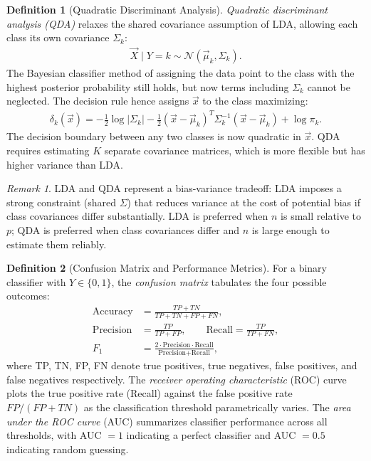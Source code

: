 \documentclass[11pt]{article}
\theoremstyle{definition}
\newtheorem{definition}{Definition}[section]
\theoremstyle{plain}
\theoremstyle{remark}
\newtheorem{remark}{Remark}[section]
\begin{document}
\begin{definition}[Quadratic Discriminant Analysis]
    \textit{Quadratic discriminant analysis (QDA)} relaxes the shared covariance assumption of LDA, allowing each class its own covariance $\Sigma_k$:
    \begin{align}
        \vec{X} \mid Y = k \sim \mathcal{N}(\vec{\mu}_k, \Sigma_k).
    \end{align}
    The Bayesian classifier method of assigning the data point to the class with the highest posterior probability still holds, but now terms including $\Sigma_k$ cannot be neglected. The decision rule hence assigns $\vec{x}$ to the class maximizing:
    \begin{align}
        \delta_k(\vec{x}) = -\frac{1}{2}\log|\Sigma_k| - \frac{1}{2}(\vec{x}-\vec{\mu}_k)^T\Sigma_k^{-1}(\vec{x}-\vec{\mu}_k) + \log\pi_k.
    \end{align}
    The decision boundary between any two classes is now quadratic in $\vec{x}$. QDA requires estimating $K$ separate covariance matrices, which is more flexible but has higher variance than LDA.
\end{definition}

\begin{remark}
    LDA and QDA represent a bias-variance tradeoff: LDA imposes a strong constraint (shared $\Sigma$) that reduces variance at the cost of potential bias if class covariances differ substantially. LDA is preferred when $n$ is small relative to $p$; QDA is preferred when class covariances differ and $n$ is large enough to estimate them reliably.
\end{remark}

\begin{definition}[Confusion Matrix and Performance Metrics]
    For a binary classifier with $Y \in \{0,1\}$, the \emph{confusion matrix} tabulates the four possible outcomes:
    \begin{align}
        \text{Accuracy} &= \frac{TP + TN}{TP + TN + FP + FN}, \\
        \text{Precision} &= \frac{TP}{TP + FP}, \qquad \text{Recall} = \frac{TP}{TP + FN}, \\
        F_1 &= \frac{2 \cdot \text{Precision} \cdot \text{Recall}}{\text{Precision} + \text{Recall}},
    \end{align}
    where TP, TN, FP, FN denote true positives, true negatives, false positives, and false negatives respectively. The \emph{receiver operating characteristic} (ROC) curve plots the true positive rate (Recall) against the false positive rate $FP/(FP+TN)$ as the classification threshold parametrically varies. The \emph{area under the ROC curve} (AUC) summarizes classifier performance across all thresholds, with AUC $= 1$ indicating a perfect classifier and AUC $= 0.5$ indicating random guessing.
\end{definition}
\end{document}
